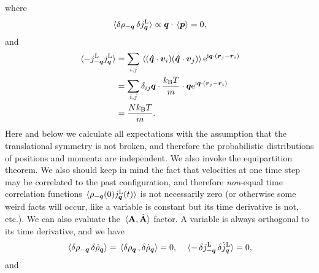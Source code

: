 \documentclass[hyperref, a4paper]{article}
\newcommand*{\ii}{\mathrm{i}}
\newcommand*{\ee}{\mathrm{e}}
\begin{document}
where 
\[
    \expval*{\var{\rho_{-\vb*{q}}} \var{{j}^\text{L}_{\vb*{q}}} } \propto \vb*{q} \cdot \expval*{\vb*{p}}  = 0,
\]
and 
\[
    \begin{aligned}
        \expval*{- j^\text{L}_{-\vb*{q}} j^\text{L}_{\vb*{q}}} &= 
        \sum_{i, j} \expval*{(\vu*{q} \cdot \vb*{v}_i) (\vu*{q} \cdot \vb*{v}_j)} \ee^{\ii \vb*{q} \cdot (\vb*{r}_j - \vb*{r}_i)} \\
        &= \sum_{i, j} \delta_{ij} \vb*{q} \cdot \frac{k_\text{B} T}{m}  \cdot  \vb*{q} \ee^{\ii \vb*{q} \cdot (\vb*{r}_j - \vb*{r}_i)} \\
        &= \frac{N k_\text{B} T}{m}.
    \end{aligned}
\]
Here and below we calculate all expectations with the assumption that the translational symmetry is not broken,
and therefore the probabilistic distributions of positions and momenta are independent. We also invoke the
equipartition theorem. We also should keep in mind the fact that velocities at one time step may be correlated to
the past configuration, and therefore \emph{non}-equal time correlation functions $\expval*{\rho_{-\vb*{q}}(0) j^\text{L}_{\vb*{q}}(t)}$ is not necessarily 
zero (or otherwise some weird facts will occur, like a variable is constant but its time derivative is not, etc.).
We can also evaluate the $\expval*{\vb{A}, \dot{\vb{A}}}$ factor. A variable is always 
orthogonal to its time derivative, and we have 
\[
    \expval*{\var{\rho_{-\vb*{q}}} \var{\dot{\rho}_{\vb*{q}}} } = \expval*{\var{\rho_{\vb*{q}}}, \var{\dot{\rho}_{\vb*{q}}} } = 0, \quad 
    \expval*{-\var{j^\text{L}_{-\vb*{q}}} \var{\dot{j}^\text{L}_{\vb*{q}}} } = 0,
\]
and 
\end{document}

